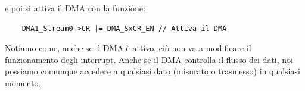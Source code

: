 e poi si attiva il DMA con la funzione:

\begin{verbatim}
    DMA1_Stream0->CR |= DMA_SxCR_EN // Attiva il DMA
\end{verbatim}

\begin{flushleft}

    \colorbox{notebox}{
    \begin{minipage}[]{\textwidth}
        Notiamo come, anche se il DMA è attivo, ciò non va a modificare il funzionamento degli interrupt. Anche se il DMA controlla il flusso dei dati, noi possiamo comunque accedere a qualsiasi dato (misurato o trasmesso) in qualsiasi momento.
    \end{minipage}
}
\end{flushleft}
